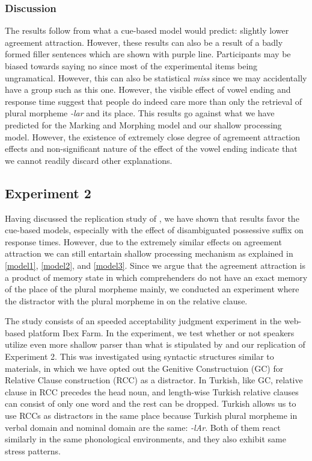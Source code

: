 \documentclass[doc]{apa6}
\begin{document}
\hypertarget{discussion}{%
\subsubsection{Discussion}\label{discussion}}

The results follow from what a cue-based model would predict: slightly lower agreement attraction. However, these results can also be a result of a badly formed filler sentences which are shown with purple line. Participants may be biased towards saying no since most of the experimental items being ungramatical. However, this can also be statistical \emph{miss} since we may accidentally have a group such as this one. However, the visible effect of vowel ending and response time suggest that people do indeed care more than only the retrieval of plural morpheme \emph{-lar} and its place. This results go against what we have predicted for the Marking and Morphing model and our shallow processing model. However, the existence of extremely close degree of agremeent attraction effects and non-significant nature of the effect of the vowel ending indicate that we cannot readily discard other explanations.

\hypertarget{experiment-2}{%
\subsection{Experiment 2}\label{experiment-2}}

Having discussed the replication study of \textcite{Lago2018}, we have shown that results favor the cue-based models, especially with the effect of disambiguated possessive suffix on response times. However, due to the extremely similar effects on agreement attraction we can still entartain shallow processing mechanism as explained in \autoref{model1}, \autoref{model2}, and \autoref{model3}. Since we argue that the agreement attraction is a product of memory state in which comprehenders do not have an exact memory of the place of the plural morpheme mainly, we conducted an experiment where the distractor with the plural morpheme in on the relative clause.

The study consists of an speeded acceptability judgment experiment in the web-based platform Ibex Farm. In the experiment, we test whether or not speakers utilize even more shallow parser than what is stipulated by \textcite{Lago2018} and our replication of \textcite{Lago2018} Experiment 2. This was investigated using syntactic structures similar to \textcite{Lago2018} materials, in which we have opted out the Genitive Constructuion (GC) for Relative Clause construction (RCC) as a distractor. In Turkish, like GC, relative clause in RCC precedes the head noun, and length-wise Turkish relative clauses can consist of only one word and the rest can be dropped. Turkish allows us to use RCCs as distractors in the same place because Turkish plural morpheme in verbal domain and nominal domain are the same: \emph{-lAr}. Both of them react similarly in the same phonological environments, and they also exhibit same stress patterns.
\end{document}

